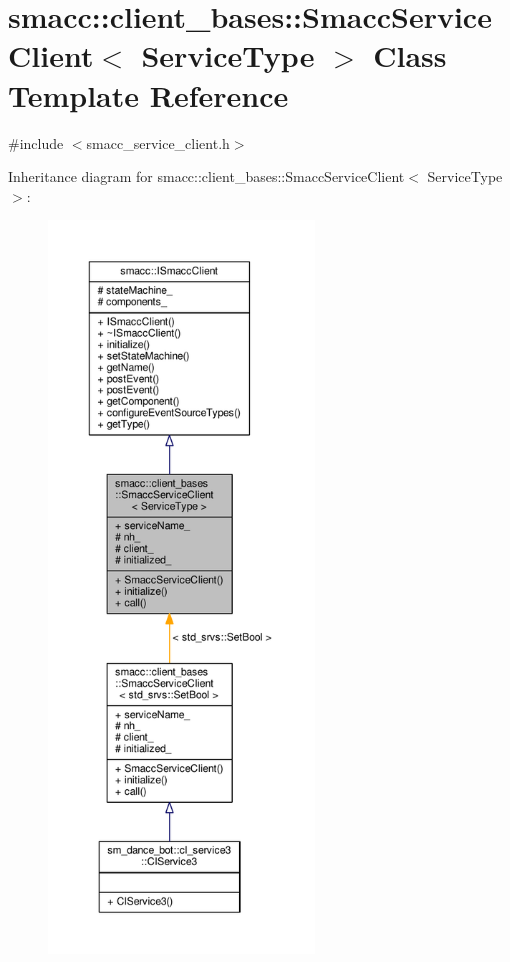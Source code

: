 \hypertarget{classsmacc_1_1client__bases_1_1SmaccServiceClient}{}\section{smacc\+:\+:client\+\_\+bases\+:\+:Smacc\+Service\+Client$<$ Service\+Type $>$ Class Template Reference}
\label{classsmacc_1_1client__bases_1_1SmaccServiceClient}


{\ttfamily \#include $<$smacc\+\_\+service\+\_\+client.\+h$>$}



Inheritance diagram for smacc\+:\+:client\+\_\+bases\+:\+:Smacc\+Service\+Client$<$ Service\+Type $>$\+:\nopagebreak
\begin{figure}[H]
\begin{center}
\leavevmode
\includegraphics[height=550pt]{classsmacc_1_1client__bases_1_1SmaccServiceClient__inherit__graph}
\end{center}
\end{figure}


